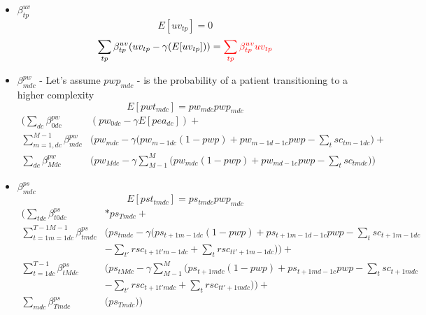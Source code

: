 \documentclass{article}
\begin{document}
\begin{itemize}
	\item $\beta_{tp}^{uv}$
	\begin{equation*}
		E[uv_{tp}] = 0
	\end{equation*}
	\begin{equation*}
		\sum_{tp} \beta_{tp}^{uv} (uv_{tp} - \gamma (E[uv_{tp}])) = 
		\color{red} \sum_{tp} \beta_{tp}^{uv} uv_{tp} 
	\end{equation*}
	
	\item $\beta_{mdc}^{pw}$ - Let's assume $pwp_{mdc}$ - is the probability of a patient transitioning to a higher complexity
	\begin{equation*}
		E[pwt_{mdc}] = pw_{mdc} pwp_{mdc}		
	\end{equation*}
	{ \color{red} \begin{align*}
		\Bigg( \sum_{dc} \beta_{0dc}^{pw} & (pw_{0dc} - \gamma E[pea_{dc}]) + \\
		\sum_{m=1,dc}^{M-1} \beta_{mdc}^{pw} & ( pw_{mdc} - \gamma 
			\big( pw_{m-1dc} (1 - pwp) + pw_{m-1d-1c} pwp - \sum_{t} sc_{tm-1dc} \big) + \\
		\sum_{dc} \beta_{Mdc}^{pw} & ( pw_{Mdc} - \gamma \sum_{M-1}^{M}
			\big( pw_{mdc} (1 - pwp) + pw_{md-1c} pwp - \sum_{t} sc_{tmdc} \big) \Bigg)
	\end{align*} }

	\item $\beta_{mdc}^{ps}$
	\begin{equation*}
		E[pst_{tmdc}] = ps_{tmdc} pwp_{mdc}		
	\end{equation*}
	{ \color{red} \begin{align*}
		\Bigg( \sum_{tdc} \beta_{t0dc}^{ps} & * ps_{Tmdc} + \\
			\sum _{t=1 m=1 dc}^{T-1 M-1} \beta_{tmdc}^{ps} & 
				\bigg( ps_{tmdc} - 
					\gamma \Big( ps_{t+1m-1dc}(1-pwp) + ps_{t+1m-1d-1c} pwp - \sum_{t} sc_{t+1m-1dc} \\ 
				&  - \sum_{t'} rsc_{t+1t'm-1dc} + \sum_{t} rsc_{tt'+1m-1dc} \Big) \bigg) + \\
		\sum _{t=1dc}^{T-1} \beta_{tMdc}^{ps} & 
			\bigg( ps_{tMdc} - 
				\gamma \sum_{M-1}^{M} \Big( ps_{t+1mdc}(1-pwp) + ps_{t+1md-1c} pwp - \sum_{t} sc_{t+1mdc} \\ 
				&  - \sum_{t'} rsc_{t+1t'mdc} + \sum_{t} rsc_{tt'+1mdc} \Big) \bigg) + \\ 
		\sum_{mdc} \beta_{Tmdc}^{ps} & 
			\bigg( ps_{Tmdc} \bigg) \Bigg)
	\end{align*} }
	
\end{itemize}
\end{document}
